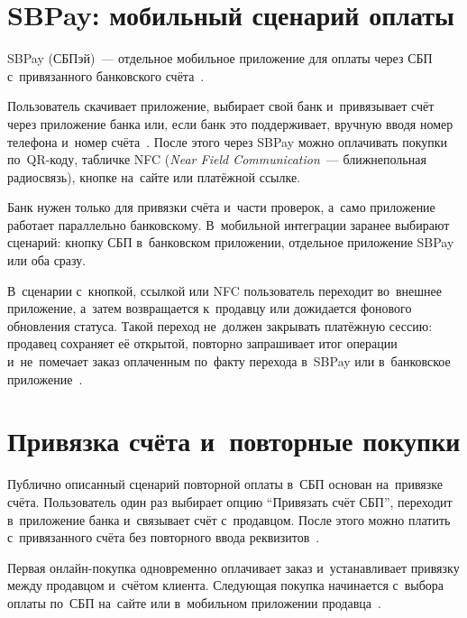 \section{SBPay: мобильный сценарий оплаты}\label{sec:sbp-sbpay}

SBPay (СБПэй)~--- отдельное мобильное приложение для оплаты через СБП
с~привязанного банковского счёта~\cite{sbpay-app}.

Пользователь скачивает приложение, выбирает свой банк и~привязывает счёт через
приложение банка или, если банк это поддерживает, вручную вводя номер телефона
и~номер счёта~\cite{sbpay-app}. После этого через SBPay можно оплачивать покупки
по~QR-коду, табличке NFC (\textit{Near Field Communication}~--- ближнепольная
радиосвязь), кнопке на~сайте или платёжной ссылке.

Банк нужен только для привязки счёта и~части проверок, а~само приложение
работает параллельно банковскому. В~мобильной интеграции заранее выбирают
сценарий: кнопку СБП в~банковском приложении, отдельное приложение SBPay
или оба сразу.

В~сценарии с~кнопкой, ссылкой или NFC пользователь переходит во~внешнее
приложение, а~затем возвращается к~продавцу или дожидается фонового обновления
статуса. Такой переход не~должен закрывать платёжную сессию: продавец сохраняет
её открытой, повторно запрашивает итог операции и~не~помечает заказ оплаченным
по~факту перехода в~SBPay или в~банковское
приложение~\cite{sbpay-app,sbp-main}.

\section{Привязка счёта и~повторные покупки}\label{sec:sbp-subscriptions}

Публично описанный сценарий повторной оплаты в~СБП основан на~привязке счёта.
Пользователь один раз выбирает опцию \enquote{Привязать счёт СБП},
переходит в~приложение банка и~связывает счёт с~продавцом. После этого можно
платить с~привязанного счёта без повторного ввода реквизитов~\cite{sbp-main}.

Первая онлайн-покупка одновременно оплачивает заказ и~устанавливает привязку
между продавцом и~счётом клиента. Следующая покупка начинается с~выбора
оплаты по~СБП на~сайте или в~мобильном приложении продавца~\cite{sbp-main}.

